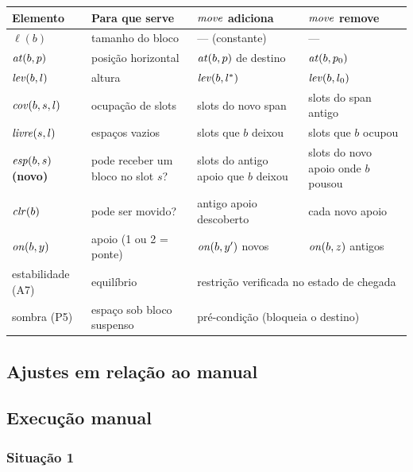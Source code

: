 \begin{center}\small
	\begin{tabularx}{\textwidth}{@{}l X X X@{}}
		\toprule
		Elemento & Para que serve & $\mathit{move}$ adiciona & $\mathit{move}$ remove\\
		\midrule
		$\ell(b)$ & tamanho do bloco & --- (constante) & ---\\
		$\mathit{at}(b,p)$ & posição horizontal & $\mathit{at}(b,p)$ de destino & $\mathit{at}(b,p_0)$\\
		$\mathit{lev}(b,l)$ & altura & $\mathit{lev}(b,l^\ast)$ & $\mathit{lev}(b,l_0)$\\
		$\mathit{cov}(b,s,l)$ & ocupação de slots & slots do novo span & slots do span antigo\\
		$\mathit{livre}(s,l)$ & espaços vazios & slots que $b$ deixou & slots que $b$ ocupou\\
		$\mathit{esp}(b,s)$ \textbf{(novo)} & pode receber um bloco no slot $s$? & slots do antigo apoio que $b$ deixou &
		slots do novo apoio onde $b$ pousou\\
		$\mathit{clr}(b)$ & pode ser movido? & antigo apoio descoberto & cada novo apoio\\
		$\mathit{on}(b,y)$ & apoio (1 ou 2 = ponte) & $\mathit{on}(b,y')$ novos & $\mathit{on}(b,z)$ antigos\\
		estabilidade (A7) & equilíbrio & \multicolumn{2}{l}{restrição verificada no estado de chegada}\\
		sombra (P5) & espaço sob bloco suspenso & \multicolumn{2}{l}{pré-condição (bloqueia o destino)}\\
		\bottomrule
	\end{tabularx}
\end{center}

\subsection{Ajustes em relação ao manual}

\subsection{Execução manual}
\label{sec:manual}
\subsubsection{Situação 1}

